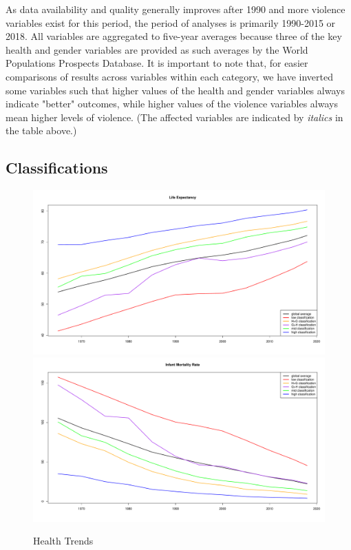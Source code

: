 \documentclass[12pt]{article}
\begin{document}
As data availability and quality generally improves after 1990 and more violence variables exist for this period, the period of analyses is primarily 1990-2015 or 2018. All variables are aggregated to five-year averages because three of the key health and gender variables are provided as such averages by the World Populations Prospects Database.
It is important to note that, for easier comparisons of results across variables within each category, we have inverted some variables such that higher values of the health and gender variables always indicate "better" outcomes, while higher values of the violence variables always mean higher levels of violence. (The affected variables are indicated by \textit{italics} in the table above.)

\subsection{Classifications}


\begin{figure}[!htb]
    \centering
    \caption{Health Trends}
    \label{trends}
    \includegraphics[width=\textwidth]{trend_life_exp_wpp.pdf}
    \includegraphics[width=\textwidth]{trend_imr_wpp.pdf}
\end{figure}
\end{document}
